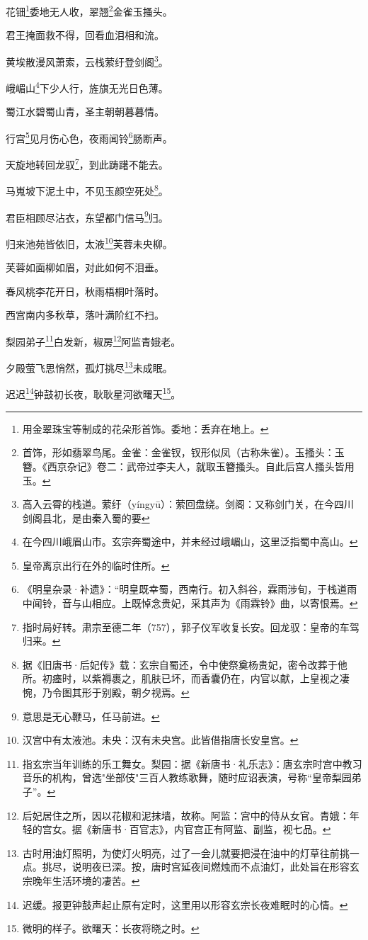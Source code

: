 \documentclass{article}
\begin{document}
花钿\footnote{用金翠珠宝等制成的花朵形首饰。委地：丢弃在地上。}委地无人收，翠翘\footnote{首饰，形如翡翠鸟尾。金雀：金雀钗，钗形似凤（古称朱雀）。玉搔头：玉簪。《西京杂记》卷二：武帝过李夫人，就取玉簪搔头。自此后宫人搔头皆用玉。}金雀玉搔头。

君王掩面救不得，回看血泪相和流。

黄埃散漫风萧索，云栈萦纡登剑阁\footnote{高入云霄的栈道。萦纡（yíngyū）：萦回盘绕。剑阁：又称剑门关，在今四川剑阁县北，是由秦入蜀的要}。

峨嵋山\footnote{在今四川峨眉山市。玄宗奔蜀途中，并未经过峨嵋山，这里泛指蜀中高山。}下少人行，旌旗无光日色薄。

蜀江水碧蜀山青，圣主朝朝暮暮情。

行宫\footnote{皇帝离京出行在外的临时住所。}见月伤心色，夜雨闻铃\footnote{《明皇杂录·补遗》：“明皇既幸蜀，西南行。初入斜谷，霖雨涉旬，于栈道雨中闻铃，音与山相应。上既悼念贵妃，采其声为《雨霖铃》曲，以寄恨焉。}肠断声。

天旋地转回龙驭\footnote{指时局好转。肃宗至德二年（757），郭子仪军收复长安。回龙驭：皇帝的车驾归来。}，到此踌躇不能去。

马嵬坡下泥土中，不见玉颜空死处\footnote{据《旧唐书·后妃传》载：玄宗自蜀还，令中使祭奠杨贵妃，密令改葬于他所。初瘗时，以紫褥裹之，肌肤已坏，而香囊仍在，内官以献，上皇视之凄惋，乃令图其形于别殿，朝夕视焉。}。

君臣相顾尽沾衣，东望都门信马\footnote{意思是无心鞭马，任马前进。}归。

归来池苑皆依旧，太液\footnote{汉宫中有太液池。未央：汉有未央宫。此皆借指唐长安皇宫。}芙蓉未央柳。

芙蓉如面柳如眉，对此如何不泪垂。

春风桃李花开日，秋雨梧桐叶落时。

西宫南内多秋草，落叶满阶红不扫。

梨园弟子\footnote{指玄宗当年训练的乐工舞女。梨园：据《新唐书·礼乐志》：唐玄宗时宫中教习音乐的机构，曾选"坐部伎"三百人教练歌舞，随时应诏表演，号称“皇帝梨园弟子”。}白发新，椒房\footnote{后妃居住之所，因以花椒和泥抹墙，故称。阿监：宫中的侍从女官。青娥：年轻的宫女。据《新唐书·百官志》，内官宫正有阿监、副监，视七品。}阿监青娥老。

夕殿萤飞思悄然，孤灯挑尽\footnote{古时用油灯照明，为使灯火明亮，过了一会儿就要把浸在油中的灯草往前挑一点。挑尽，说明夜已深。按，唐时宫延夜间燃烛而不点油灯，此处旨在形容玄宗晚年生活环境的凄苦。}未成眠。

迟迟\footnote{迟缓。报更钟鼓声起止原有定时，这里用以形容玄宗长夜难眠时的心情。}钟鼓初长夜，耿耿星河欲曙天\footnote{微明的样子。欲曙天：长夜将晓之时。}。
\end{document}
